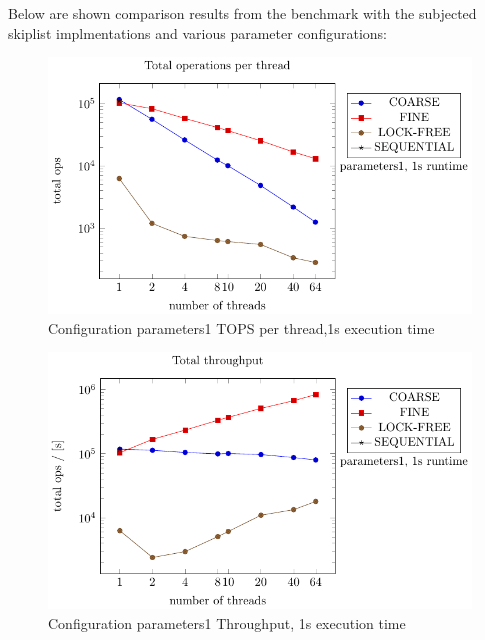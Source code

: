 \documentclass{article}
\begin{document}
Below are shown comparison results from the benchmark with the subjected skiplist implmentations and various parameter configurations:
    \begin{figure}[H]
        \centering
        \includegraphics{../plots/parameters1_1s_per_thread.pdf}
        \caption{Configuration parameters1 TOPS per thread,1s execution time}
       
        \label{fig:parameters1_1s_per_thread}
    \end{figure}

    \begin{figure}[H]
        \centering
        \includegraphics{../plots/parameters1_1s_throughput.pdf}
        \caption{Configuration parameters1 Throughput, 1s execution time}
        \label{fig:parameters1_1s_throughput}
    \end{figure}
\end{document}
